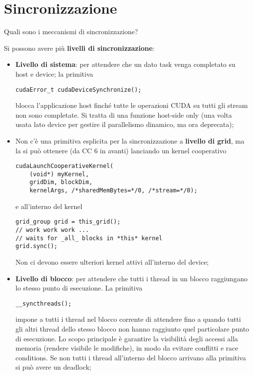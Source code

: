 \section{Sincronizzazione}

\begin{questions}
    \question Quali sono i meccanismi di sincronizzazione?
    
    \begin{solution}
        Si possono avere più \textbf{livelli di sincronizzazione}:
        \begin{itemize}
            \item \textbf{Livello di sistema}: per attendere che un dato task venga completato su host e device; la primitiva
            \begin{verbatim}
cudaError_t cudaDeviceSynchronize();
            \end{verbatim}
            blocca l'applicazione host finché tutte le operazioni CUDA su tutti gli stream non sono completate. Si tratta di una funzione host-side only (una volta usata lato device per gestire il parallelismo dinamico, ma ora deprecata);
            
            \item Non c'è una primitiva esplicita per la sincronizzazione a \textbf{livello di grid}, ma la si può ottenere (da CC 6 in avanti) lanciando un kernel cooperativo
            \begin{verbatim}
cudaLaunchCooperativeKernel(
    (void*) myKernel,
    gridDim, blockDim,
    kernelArgs, /*sharedMemBytes=*/0, /*stream=*/0);
            \end{verbatim}
            e all'interno del kernel
            \begin{verbatim}
grid_group grid = this_grid();
// work work work ...
// waits for _all_ blocks in *this* kernel
grid.sync();
            \end{verbatim}
            Non ci devono essere ulteriori kernel attivi all'interno del device;
            
            \item \textbf{Livello di blocco}: per attendere che tutti i thread in un blocco raggiungano lo stesso punto di esecuzione. La primitiva
            \begin{verbatim}
__syncthreads();
            \end{verbatim}
            impone a tutti i thread nel blocco corrente di attendere fino a quando tutti gli altri thread dello stesso blocco non hanno raggiunto quel particolare punto di esecuzione. Lo scopo principale è garantire la visibilità degli accessi alla memoria (rendere visibile le modifiche), in modo da evitare conflitti e race conditions. Se non tutti i thread all'interno del blocco arrivano alla primitiva si può avere un deadlock;
            

\end{itemize}
\end{solution}
\end{questions}
